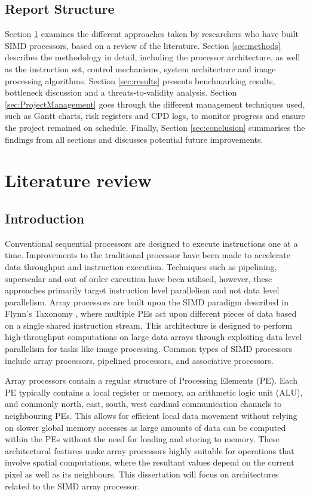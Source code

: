   \subsection{Report Structure}
   Section \ref{sec:Literature Review} examines the different approaches taken by researchers who have built SIMD processors, based on a review of the literature. Section \ref{sec:methods} describes the methodology in detail, including the processor architecture, as well as the instruction set, control mechanisms, system architecture and image processing algorithms. Section \ref{sec:results} presents benchmarking results, bottleneck discussion and a threats-to-validity analysis. Section \ref{sec:ProjectManagement} goes through the different management techniques used, such as Gantt charts, risk registers and CPD logs, to monitor progress and ensure the project remained on schedule. Finally, Section \ref{sec:conclusion} summarises the findings from all sections and discusses potential future improvements. 

\section{Literature review}\label{sec:Literature Review}

  \subsection{Introduction}
        Conventional sequential processors are designed to execute instructions one at a time. Improvements to the traditional processor have been made to accelerate data throughput and instruction execution. Techniques such as pipelining, superscalar and out of order execution have been utilised, however, these approaches primarily target instruction level parallelism and not data level parallelism. Array processors are built upon the SIMD paradigm described in Flynn's Taxonomy \cite{ref:Flynn1966}, where multiple PEs act upon different pieces of data based on a single shared instruction stream. This architecture is designed to perform high-throughput computations on large data arrays through exploiting data level parallelism for tasks like image processing. Common types of SIMD processors include array processors, pipelined processors, and associative processors. \cite{ref:Flynn1972}

        Array processors contain a regular structure of Processing Elements (PE). Each PE typically contains a local register or memory, an arithmetic logic unit (ALU), and commonly north, east, south, west cardinal communication channels to neighbouring PEs. This allows for efficient local data movement without relying on slower global memory accesses as large amounts of data can be computed within the PEs without the need for loading and storing to memory. These architectural features make array processors highly suitable for operations that involve spatial computations, where the resultant values depend on the current pixel as well as its neighbours. This dissertation will focus on architectures related to the SIMD array processor. 

